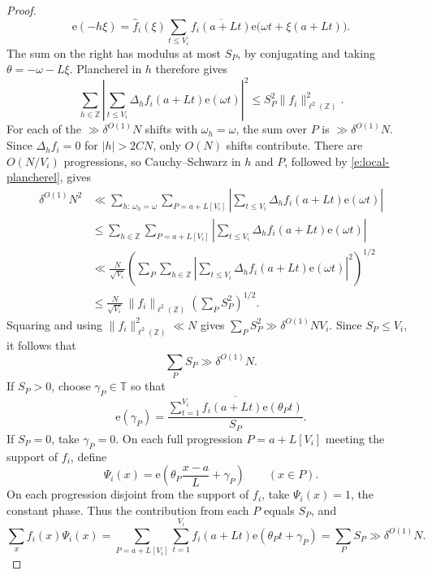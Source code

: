 \documentclass[12pt]{amsart}
\newcommand{\1}{\mathbf 1}
\newcommand{\e}{\mathrm e}
\theoremstyle{definition}
\begin{document}
\begin{proof}
\[       \e(-h\xi)
 =\widehat f_i(\xi)\sum_{t\le V_i}
   \overline{f_i(a+Lt)}\e\bigl(\omega t+\xi(a+Lt)\bigr).
\]
The sum on the right has modulus at most \(S_P\), by conjugating
and taking \(\theta=-\omega-L\xi\). Plancherel in \(h\) therefore gives
\begin{equation}\label{e:local-plancherel}
 \sum_{h\in\mathbb Z}
 \left|\sum_{t\le V_i}\Delta_h f_i(a+Lt)\e(\omega t)\right|^2
 \le S_P^2\|f_i\|_{\ell^2(\mathbb Z)}^2.
\end{equation}
For each of the \(\gg\delta^{O(1)}N\) shifts with \(\omega_h=\omega\),
the sum over \(P\) is \(\gg\delta^{O(1)}N\). Since
\(\Delta_h f_i=0\) for \(|h|>2CN\), only \(O(N)\) shifts contribute.
There are \(O(N/V_i)\) progressions, so Cauchy--Schwarz in \(h\)
and \(P\), followed by \eqref{e:local-plancherel}, gives
\[
\begin{aligned}
 \delta^{O(1)}N^2
 &\ll \sum_{h:\,\omega_h=\omega}\sum_{P=a+L[V_i]}
      \left|\sum_{t\le V_i}\Delta_h f_i(a+Lt)\e(\omega t)\right|\\
 &\le \sum_{h\in\mathbb Z}\sum_{P=a+L[V_i]}
      \left|\sum_{t\le V_i}\Delta_h f_i(a+Lt)\e(\omega t)\right|\\
 &\ll \frac{N}{\sqrt{V_i}}
      \left(\sum_P\sum_{h\in\mathbb Z}
      \left|\sum_{t\le V_i}\Delta_h f_i(a+Lt)\e(\omega t)\right|^2
      \right)^{1/2}\\
 &\le \frac{N}{\sqrt{V_i}}\,
      \|f_i\|_{\ell^2(\mathbb Z)}
      \left(\sum_P S_P^2\right)^{1/2}.
\end{aligned}
\]
Squaring and using \(\|f_i\|_{\ell^2(\mathbb Z)}^2\ll N\) gives
\(\sum_P S_P^2\gg\delta^{O(1)}NV_i\).
Since \(S_P\leq V_i\), it follows that
\[\sum_P S_P\gg\delta^{O(1)}N.\]
If \(S_P>0\), choose \(\gamma_P\in\mathbb T\) so that
\[
 \e(\gamma_P)
 =\frac{\overline{\sum_{t=1}^{V_i}f_i(a+Lt)\e(\theta_Pt)}}{S_P}.
\]
If \(S_P=0\), take \(\gamma_P=0\). On each full progression \(P=a+L[V_i]\) meeting the support of
\(f_i\), define
\[
 \Psi_i(x)=\e\!\left(\theta_P\frac{x-a}{L}+\gamma_P\right)
 \qquad (x\in P).
\]
On each progression disjoint from the support of \(f_i\), take
\(\Psi_i(x)=1\), the constant phase.  Thus the contribution
from each \(P\) equals \(S_P\), and
\[
 \sum_x f_i(x)\Psi_i(x)
 =\sum_{P=a+L[V_i]}\sum_{t=1}^{V_i}
      f_i(a+Lt)\e(\theta_Pt+\gamma_P)
 =\sum_P S_P
 \gg \delta^{O(1)}N.
\]
\end{proof}
\end{document}
